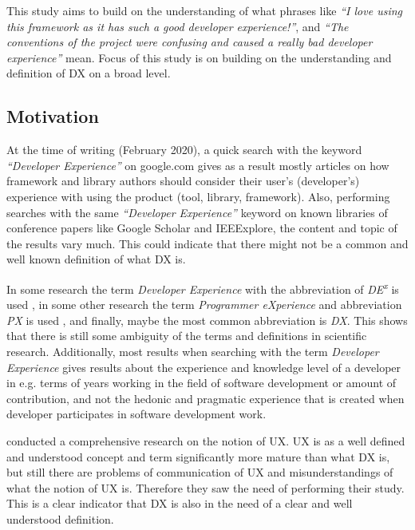 \documentclass[english, 12pt, a4paper, sci, utf8, a-1b, online]{aaltothesis}
\newcommand{\now}{February 2020}
\begin{document}
This study aims to build on the understanding of what phrases like \textit{``I love using this framework as it has such a good developer experience!''}, and \textit{``The conventions of the project were confusing and caused a really bad developer experience''} mean. Focus of this study is on building on the understanding and definition of DX on a broad level.

\thispagestyle{empty}

\subsection{Motivation} \label{section:motivation}

At the time of writing (\now), a quick search with the keyword \textit{``Developer Experience''} on google.com gives as a result mostly articles on how framework and library authors should consider their user's (developer's) experience with using the product (tool, library, framework). Also, performing searches with the same \textit{``Developer Experience''} keyword on known libraries of conference papers like Google Scholar and IEEExplore, the content and topic of the results vary much. This could indicate that there might not be a common and well known definition of what DX is.

In some research the term \textit{Developer Experience} with the abbreviation of \textit{DE\textsuperscript{x}} is used \parencite{fagerholm-dx-concept-and-definition}, in some other research the term \textit{Programmer eXperience} and abbreviation \textit{PX} is used \parencite{programmer-experience}, and finally, maybe the most common abbreviation is \textit{DX}. This shows that there is still some ambiguity of the terms and definitions in scientific research. Additionally, most results when searching with the term \textit{Developer Experience} gives results about the experience and knowledge level of a developer in e.g. terms of years working in the field of software development or amount of contribution, and not the hedonic and pragmatic experience that is created when developer participates in software development work.

\textcite{understanding-ux} conducted a comprehensive research on the notion of UX. UX is as a well defined and understood concept and term significantly more mature than what DX is, but still there are problems of communication of UX and misunderstandings of what the notion of UX is. Therefore they saw the need of performing their study. This is a clear indicator that DX is also in the need of a clear and well understood definition.
\end{document}
